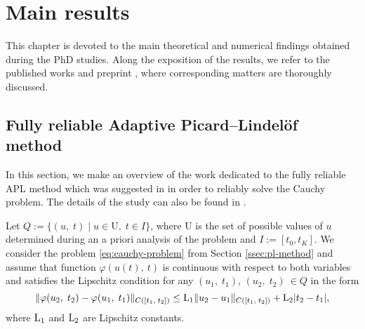 \chapter{Main results}
\label{chapter:estimates}

This chapter is devoted to the main theoretical and numerical findings obtained during 
the PhD studies. Along the exposition of the results, we refer to the published works
\cite{RefMatculevichNeittaanmakiRepin2013, RefMatculevichRepin2014, 
RefMatculevichNeitaanmakiRepin2015, RefMatculevichRepinPoincare2014} and preprint 
\cite{RefArxivMatculevichRepin2015}, where corresponding matters are thoroughly 
discussed. 

\section{Fully reliable Adaptive Picard--Lindel\"{o}f method}
\label{sec:pl-guaranteed-method}

In this section, we make an overview of the work dedicated to the fully reliable APL 
method which was suggested in \cite{RefMatculevichNeittaanmakiRepin2013} in order to 
reliably solve the Cauchy problem. The details of the study can also be found in 
\cite[Section 6.7.6]{Malietall2014}. 

Let $Q := \big\{(u,\;t)\;\vert\;u \in \mathrm{U},\; t \in I \big\}$, where $\mathrm{U}$ 
is the set of possible values of $u$ determined during an a priori analysis of the 
problem and $I := [t_0, t_K]$. We consider the problem \eqref{eq:cauchy-problem} from 
Section \ref{ssec:pl-method} and assume that function $\varphi(u(t),\:t)$ is continuous 
with respect to both variables and satisfies the Lipschitz condition for any 
$(u_1,\;t_1)$, $(u_2,\;t_2)\:\in Q$ in the form
%
\begin{equation*}
	\|\varphi(u_2,\;t_2) - \varphi(u_1,\;t_1)\|_{C([t_1,\;t_2])} \leq
	\constL_1 \|u_2 - u_1\|_{C([t_1,\;t_2])} + \constL_2 \vert t_2 - t_1 \vert,
	\label{eq:iter3-lipschitz-property}
\end{equation*}
%
where $\mathrm{L}_1$ and $\mathrm{L}_2$ are Lipschitz constants.

